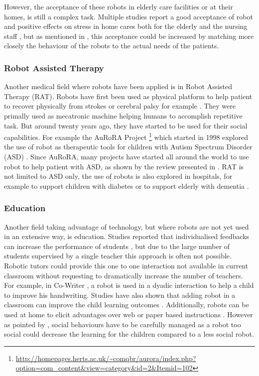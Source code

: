     However, the acceptance of these robots in elderly care facilities or at
    their homes, is still a complex task. Multiple studies report a good
    acceptance of robot and positive effects on stress in home cares both for
    the elderly and the nursing staff \citep{wada2004effects}, but as mentioned
    in \citep{broadbent2009acceptance}, this acceptance could be increased by
    matching more closely the behaviour of the robots to the actual needs of the
    patients.	
		
\subsubsection{Robot Assisted Therapy}
	
    Another medical field where robots have been applied is in Robot Assisted
    Therapy (RAT). Robots have first been used as physical platform to help
    patient to recover physically from strokes or cerebral palsy for example
    \citep{sivan2011systematic}. They were primally used as mecatronic machine
    helping humans to accomplish repetitive task. But around twenty years ago,
    they have started to be used for their social capabilities. For example the
    AuRoRA Project
    \footnote{\url{http://homepages.herts.ac.uk/~comqbr/aurora/index.php?option=com_content&view=category&id=2&Itemid=102}}
    which started in 1998 explored the use of robot as therapeutic tools for
    children with Autism Spectrum Disorder (ASD) \citep{dautenhahn1999robots}.
    Since AuRoRA, many projects have started all around the world to use robot
    to help patient with ASD, as shown by the review presented in
    \citep{diehl2012clinical}. RAT is not limited to ASD only, the use of robots
    is also explored in hospitals, for example to support children with diabetes
    \citep{belpaeme2012multimodal} or to support elderly with dementia
    \citep{wada2005psychological}.	
	
\subsubsection{Education} 

    Another field taking advantage of technology, but where robots are not yet
    used in an extensive way, is education. Studies reported that individualised
    feedbacks can increase the performance of students \citep{bloom19842}, but
    due to the large number of students supervised by a single teacher this
    approach is often not possible. Robotic tutors could provide this one to one
    interaction not available in current classroom without requesting to
    dramatically increase the number of teachers. For example, in Co-Writer
    \citep{hood2015children}, a robot is used in a dyadic interaction to help a
    child to improve his handwriting. Studies have also shown that adding robot
    in a classroom can improve the child learning outcomes
    \citep{kanda2004interactive}. Additionally, robots can be used at home to
    elicit advantages over web or paper based instructions
    \citep{han2005educational}. However as pointed by \citet{kennedy2015robot},
    social behaviours have to be carefully managed as a robot too social could
    decrease the learning for the children compared to a less social robot. 
	
